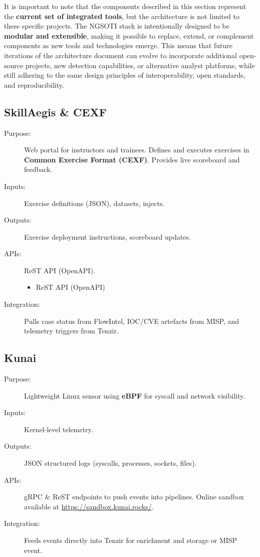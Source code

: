 \documentclass[10pt,a4paper]{report}
\begin{document}
It is important to note that the components described in this section
represent the \textbf{current set of integrated tools}, but the architecture is
not limited to these specific projects. The NGSOTI stack is intentionally
designed to be \textbf{modular and extensible}, making it possible to replace,
extend, or complement components as new tools and technologies emerge. This
means that future iterations of the architecture document can evolve to
incorporate additional open-source projects, new detection capabilities, or
alternative analyst platforms, while still adhering to the same design
principles of interoperability, open standards, and reproducibility.

\subsection{SkillAegis \& CEXF}
\begin{description}
  \item[Purpose:] Web portal for instructors and trainees. Defines and executes
        exercises in \textbf{Common Exercise Format (CEXF)\cite{cexf}}. Provides live
        scoreboard and feedback.
  \item[Inputs:] Exercise definitions (JSON), datasets, injects.
  \item[Outputs:] Exercise deployment instructions, scoreboard updates.
  \item[APIs:] ReST API (OpenAPI).
    \begin{itemize}
        \item ReST API (OpenAPI)
    \end{itemize}
  \item[Integration:] Pulls case status from FlowIntel, IOC/CVE
artefacts from MISP, and telemetry triggers from Tenzir.
\end{description}


\subsection{Kunai}

\begin{description}
  \item[Purpose:] Lightweight Linux sensor using \textbf{eBPF} for syscall and
       network visibility.
  \item[Inputs:] Kernel-level telemetry.
  \item[Outputs:] JSON structured logs (syscalls, processes, sockets, files).
  \item[APIs:] gRPC \& ReST endpoints to push events into pipelines. Online
       sandbox available at \url{https://sandbox.kunai.rocks/}.
  \item[Integration:] Feeds events directly into Tenzir for enrichment and
       storage or MISP event.
\end{description}
\end{document}
